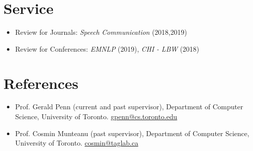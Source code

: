 \documentclass{article}
\begin{document}

\section{Service}

\begin{itemize}
  \item Review for Journals: \textit{Speech Communication} (2018,2019)
  \item Review for Conferences: \textit{EMNLP} (2019),
        \textit{CHI - LBW} (2018)
\end{itemize}

\section{References}

\begin{itemize}
  \item Prof. Gerald Penn (current and past supervisor), Department of
    Computer Science, University of Toronto.
    \href{mailto:gpenn@cs.toronto.edu}{gpenn@cs.toronto.edu}
  \item Prof. Cosmin Munteanu (past supervisor), Department of Computer Science,
    University of Toronto. \href{mailto:cosmin@taglab.ca}{cosmin@taglab.ca}
\end{itemize}
\end{document}
